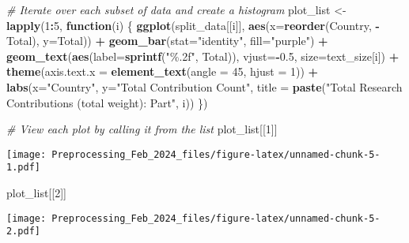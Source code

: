 \documentclass[
]{article}
\newenvironment{Shaded}{\begin{snugshade}}{\end{snugshade}}
\newcommand{\AttributeTok}[1]{\textcolor[rgb]{0.13,0.29,0.53}{#1}}
\newcommand{\CommentTok}[1]{\textcolor[rgb]{0.56,0.35,0.01}{\textit{#1}}}
\newcommand{\ControlFlowTok}[1]{\textcolor[rgb]{0.13,0.29,0.53}{\textbf{#1}}}
\newcommand{\DecValTok}[1]{\textcolor[rgb]{0.00,0.00,0.81}{#1}}
\newcommand{\FloatTok}[1]{\textcolor[rgb]{0.00,0.00,0.81}{#1}}
\newcommand{\FunctionTok}[1]{\textcolor[rgb]{0.13,0.29,0.53}{\textbf{#1}}}
\newcommand{\NormalTok}[1]{#1}
\newcommand{\OtherTok}[1]{\textcolor[rgb]{0.56,0.35,0.01}{#1}}
\newcommand{\SpecialCharTok}[1]{\textcolor[rgb]{0.81,0.36,0.00}{\textbf{#1}}}
\newcommand{\StringTok}[1]{\textcolor[rgb]{0.31,0.60,0.02}{#1}}
\begin{document}
\begin{Shaded}
\begin{Highlighting}[]
\CommentTok{\# Iterate over each subset of data and create a histogram}
\NormalTok{plot\_list }\OtherTok{\textless{}{-}} \FunctionTok{lapply}\NormalTok{(}\DecValTok{1}\SpecialCharTok{:}\DecValTok{5}\NormalTok{, }\ControlFlowTok{function}\NormalTok{(i) \{}
  \FunctionTok{ggplot}\NormalTok{(split\_data[[i]], }\FunctionTok{aes}\NormalTok{(}\AttributeTok{x=}\FunctionTok{reorder}\NormalTok{(Country, }\SpecialCharTok{{-}}\NormalTok{Total), }\AttributeTok{y=}\NormalTok{Total)) }\SpecialCharTok{+}
    \FunctionTok{geom\_bar}\NormalTok{(}\AttributeTok{stat=}\StringTok{"identity"}\NormalTok{, }\AttributeTok{fill=}\StringTok{"purple"}\NormalTok{) }\SpecialCharTok{+}
    \FunctionTok{geom\_text}\NormalTok{(}\FunctionTok{aes}\NormalTok{(}\AttributeTok{label=}\FunctionTok{sprintf}\NormalTok{(}\StringTok{"\%.2f"}\NormalTok{, Total)), }\AttributeTok{vjust=}\SpecialCharTok{{-}}\FloatTok{0.5}\NormalTok{, }\AttributeTok{size=}\NormalTok{text\_size[i]) }\SpecialCharTok{+}
    \FunctionTok{theme}\NormalTok{(}\AttributeTok{axis.text.x =} \FunctionTok{element\_text}\NormalTok{(}\AttributeTok{angle =} \DecValTok{45}\NormalTok{, }\AttributeTok{hjust =} \DecValTok{1}\NormalTok{)) }\SpecialCharTok{+}
    \FunctionTok{labs}\NormalTok{(}\AttributeTok{x=}\StringTok{"Country"}\NormalTok{, }\AttributeTok{y=}\StringTok{"Total Contribution Count"}\NormalTok{, }
         \AttributeTok{title =} \FunctionTok{paste}\NormalTok{(}\StringTok{"Total Research Contributions (total weight): Part"}\NormalTok{, i))}
\NormalTok{\})}
\end{Highlighting}
\end{Shaded}

\begin{Shaded}
\begin{Highlighting}[]
\CommentTok{\# View each plot by calling it from the list}
\NormalTok{plot\_list[[}\DecValTok{1}\NormalTok{]]}
\end{Highlighting}
\end{Shaded}

\texttt{[image: Preprocessing\_Feb\_2024\_files/figure-latex/unnamed-chunk-5-1.pdf]}

\begin{Shaded}
\begin{Highlighting}[]
\NormalTok{plot\_list[[}\DecValTok{2}\NormalTok{]]}
\end{Highlighting}
\end{Shaded}

\texttt{[image: Preprocessing\_Feb\_2024\_files/figure-latex/unnamed-chunk-5-2.pdf]}
\end{document}
